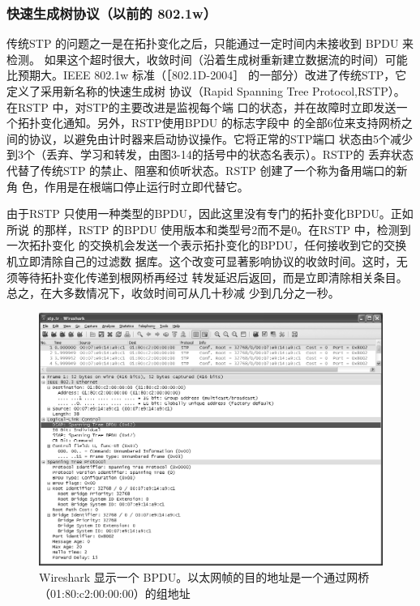 \subsubsection{快速生成树协议（以前的 802.1w）}

传统STP 的问题之一是在拓扑变化之后，只能通过一定时间内未接收到 BPDU 来检测。
如果这个超时很大，收敛时间（沿着生成树重新建立数据流的时间）可能比预期大。IEEE
802.1w 标准（［802.1D-2004］ 的一部分）改进了传统STP，它定义了采用新名称的快速生成树
协议（Rapid Spanning Tree Protocol,RSTP）。在RSTP 中，对STP的主要改进是监视每个端
口的状态，并在故障时立即发送一个拓扑变化通知。另外，RSTP使用BPDU 的标志字段中
的全部6位来支持网桥之间的协议，以避免由计时器来启动协议操作。它将正常的STP端口
状态由5个减少到3个（丢弃、学习和转发，由图3-14的括号中的状态名表示）。RSTP的
丢弃状态代替了传统STP 的禁止、阻塞和侦听状态。RSTP 创建了一个称为备用端口的新角
色，作用是在根端口停止运行时立即代替它。

由于RSTP 只使用一种类型的BPDU，因此这里没有专门的拓扑变化BPDU。正如所说
的那样，RSTP 的BPDU 使用版本和类型号2而不是0。在RSTP 中，检测到一次拓扑变化
的交换机会发送一个表示拓扑变化的BPDU，任何接收到它的交换机立即清除自己的过滤数
据库。这个改变可显著影响协议的收敛时间。这时，无须等待拓扑变化传递到根网桥再经过
转发延迟后返回，而是立即清除相关条目。总之，在大多数情况下，收敛时间可从几十秒减
少到几分之一秒。

\begin{figure}
    \centering
    \includegraphics[scale=0.5]{imgs/3/3-16.png}
    \caption{Wireshark 显示一个 BPDU。以太网帧的目的地址是一个通过网桥（01:80:c2:00:00:00）的组地址}
\end{figure}


